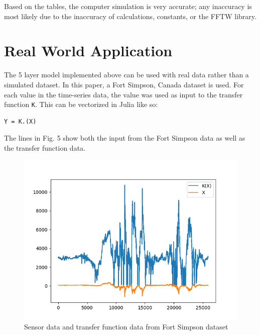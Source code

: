 \documentclass[letterpaper, 12 pt, conference]{ieeeconf}  %
\begin{document}
Based on the tables, the computer simulation is very accurate; any inaccuracy is most likely due to the inaccuracy of calculations, constants, or the FFTW library. 
     
\vspace{6cm}

\section{Real World Application}
The 5 layer model implemented above can be used with real data rather than a simulated dataset. In this paper, a Fort Simpson, Canada dataset is used. For each value in the time-series data, the value was used as input to the transfer function \verb|K|. This can be vectorized in Julia like so:
	
\begin{lstlisting}
Y = K.(X)
\end{lstlisting}
	
The lines in Fig. 5 show both the input from the Fort Simpson data as well as the transfer function data.

\begin{figure}
    \label{fig:fsim}
	   \begin{center}
	        \includegraphics[width=\columnwidth]{fsim.png}
	       \caption{Sensor data and transfer function data from Fort Simpson dataset}
	   \end{center}
	
	\end{figure}  


    

\nocite{*}
\printbibliography
\end{document}
